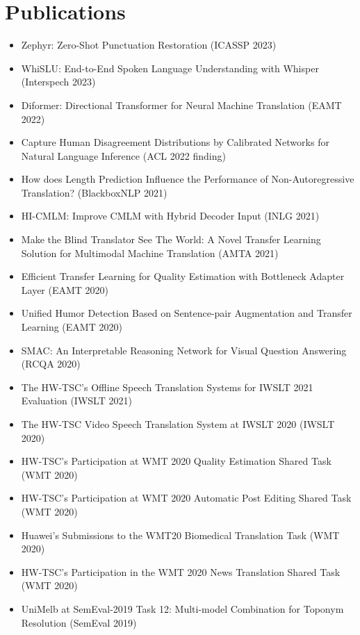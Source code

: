 \documentclass{resume_en}
\begin{document}
\section{Publications}
\begin{itemize}[parsep=0.2ex]
  \item Zephyr: Zero-Shot Punctuation Restoration (ICASSP 2023)
  \item WhiSLU: End-to-End Spoken Language Understanding with Whisper (Interspech 2023)
  \item Diformer: Directional Transformer for Neural Machine Translation (EAMT 2022)
  \item Capture Human Disagreement Distributions by Calibrated Networks for Natural Language Inference (ACL 2022 finding)
  \item How does Length Prediction Influence the Performance of Non-Autoregressive Translation? (BlackboxNLP 2021)
  \item HI-CMLM: Improve CMLM with Hybrid Decoder Input (INLG 2021)
  \item Make the Blind Translator See The World: A Novel Transfer Learning Solution for Multimodal Machine Translation (AMTA 2021)
  \item Efficient Transfer Learning for Quality Estimation with Bottleneck Adapter Layer (EAMT 2020)
  \item Unified Humor Detection Based on Sentence-pair Augmentation and Transfer Learning (EAMT 2020)
  \item SMAC: An Interpretable Reasoning Network for Visual Question Answering (RCQA 2020)
  \item The HW-TSC's Offline Speech Translation Systems for IWSLT 2021 Evaluation (IWSLT 2021)
  \item The HW-TSC Video Speech Translation System at IWSLT 2020 (IWSLT 2020)
  \item HW-TSC's Participation at WMT 2020 Quality Estimation Shared Task (WMT 2020)
  \item HW-TSC's Participation at WMT 2020 Automatic Post Editing Shared Task (WMT 2020)
  \item Huawei's Submissions to the WMT20 Biomedical Translation Task (WMT 2020)
  \item HW-TSC's Participation in the WMT 2020 News Translation Shared Task (WMT 2020)
  \item UniMelb at SemEval-2019 Task 12: Multi-model Combination for Toponym Resolution (SemEval 2019)
\end{itemize}
\end{document}

